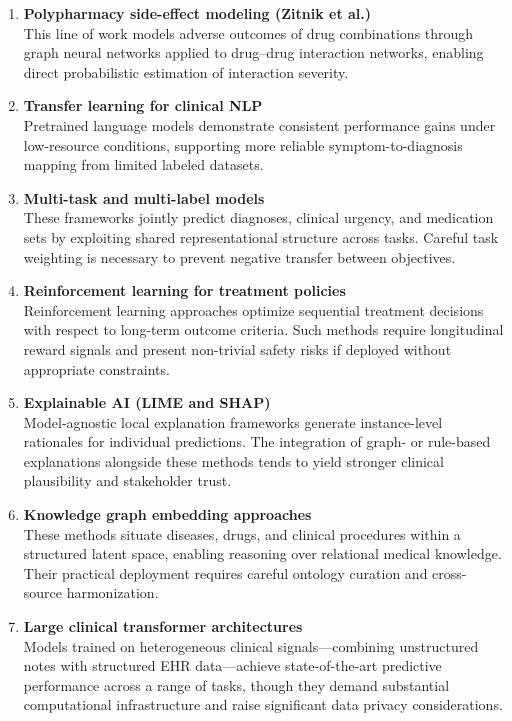 \begin{enumerate}[label=\textbf{\arabic*.}]
    \item \textbf{Polypharmacy side-effect modeling (Zitnik et al.)} \\
    This line of work models adverse outcomes of drug combinations through graph neural networks applied to drug--drug interaction networks, enabling direct probabilistic estimation of interaction severity.

    \item \textbf{Transfer learning for clinical NLP} \\
    Pretrained language models demonstrate consistent performance gains under low-resource conditions, supporting more reliable symptom-to-diagnosis mapping from limited labeled datasets.

    \item \textbf{Multi-task and multi-label models} \\
    These frameworks jointly predict diagnoses, clinical urgency, and medication sets by exploiting shared representational structure across tasks. Careful task weighting is necessary to prevent negative transfer between objectives.

    \item \textbf{Reinforcement learning for treatment policies} \\
    Reinforcement learning approaches optimize sequential treatment decisions with respect to long-term outcome criteria. Such methods require longitudinal reward signals and present non-trivial safety risks if deployed without appropriate constraints.

    \item \textbf{Explainable AI (LIME and SHAP)} \\
    Model-agnostic local explanation frameworks generate instance-level rationales for individual predictions. The integration of graph- or rule-based explanations alongside these methods tends to yield stronger clinical plausibility and stakeholder trust.

    \item \textbf{Knowledge graph embedding approaches} \\
    These methods situate diseases, drugs, and clinical procedures within a structured latent space, enabling reasoning over relational medical knowledge. Their practical deployment requires careful ontology curation and cross-source harmonization.

    \item \textbf{Large clinical transformer architectures} \\
    Models trained on heterogeneous clinical signals---combining unstructured notes with structured EHR data---achieve state-of-the-art predictive performance across a range of tasks, though they demand substantial computational infrastructure and raise significant data privacy considerations.
\end{enumerate}

